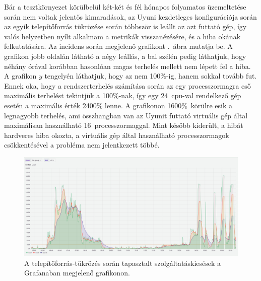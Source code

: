 Bár a tesztkörnyezet körülbelül két-két és fél hónapos folyamatos üzemeltetése során nem voltak jelentős kimaradások, az Uyuni kezdetleges konfigurációja során az egyik telepítőforrás tükrözése során többször is leállt az azt futtató gép, így valós helyzetben nyílt alkalmam a metrikák visszanézésére, és a hiba okának felkutatására. Az incidens során megjelenő grafikont .~ábra mutatja be. A grafikon jobb oldalán látható a négy leállás, a bal szélén pedig láthatjuk, hogy néhány órával korábban hasonlóan magas terhelés mellett nem lépett fel a hiba. A grafikon $ y $ tengelyén láthatjuk, hogy az nem 100\%-ig, hanem sokkal tovább fut. Ennek oka, hogy a rendszerterhelés számítása során az egy processzormagra eső maximális terhelést tekintjük a 100\%-nak, így egy 24~\acrshort{cpu}-val rendelkező gép esetén a maximális érték 2400\% lenne. A grafikonon 1600\%~körülre esik a legnagyobb terhelés, ami összhangban van az Uyunit futtató virtuális gép által maximálisan használható 16~processzormaggal. Mint később kiderült, a hibát hardveres hiba okozta, a virtuális gép által használható processzormagok csökkentésével a probléma nem jelentkezett többé.

\begin{figure}[ht]
	\centering
	\includegraphics[width=15cm]{figures/reboot-grafana-invert.jpg}
	\caption{A telepítőforrás-tükrözés során tapasztalt szolgáltatáskiesések a Grafanaban megjelenő grafikonon.}
	\label{fig:reboot-grafana}
\end{figure}
